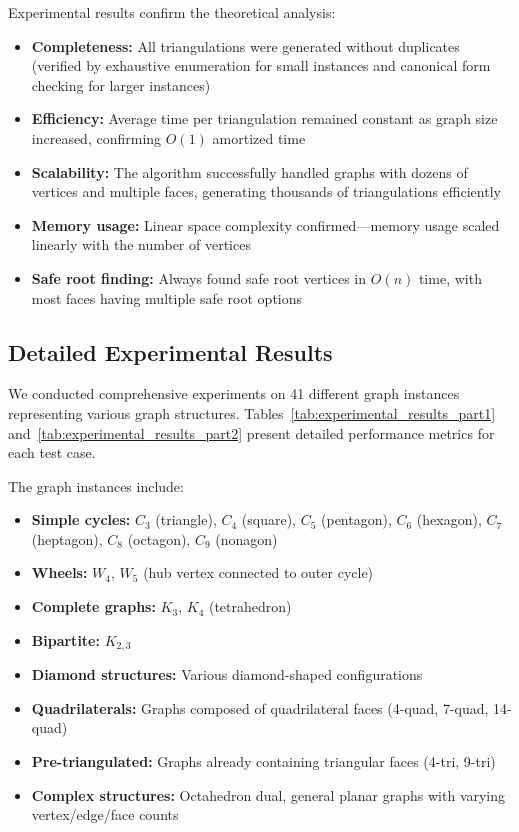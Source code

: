 \documentclass[12pt,a4paper]{article}
\theoremstyle{definition}
\theoremstyle{remark}
\begin{document}
Experimental results confirm the theoretical analysis:
\begin{itemize}
    \item \textbf{Completeness:} All triangulations were generated without duplicates (verified by exhaustive enumeration for small instances and canonical form checking for larger instances)
    \item \textbf{Efficiency:} Average time per triangulation remained constant as graph size increased, confirming $O(1)$ amortized time
    \item \textbf{Scalability:} The algorithm successfully handled graphs with dozens of vertices and multiple faces, generating thousands of triangulations efficiently
    \item \textbf{Memory usage:} Linear space complexity confirmed—memory usage scaled linearly with the number of vertices
    \item \textbf{Safe root finding:} Always found safe root vertices in $O(n)$ time, with most faces having multiple safe root options
\end{itemize}

\subsection{Detailed Experimental Results}

We conducted comprehensive experiments on 41 different graph instances representing various graph structures. Tables~\ref{tab:experimental_results_part1} and~\ref{tab:experimental_results_part2} present detailed performance metrics for each test case.

The graph instances include:
\begin{itemize}
    \item \textbf{Simple cycles:} $C_3$ (triangle), $C_4$ (square), $C_5$ (pentagon), $C_6$ (hexagon), $C_7$ (heptagon), $C_8$ (octagon), $C_9$ (nonagon)
    \item \textbf{Wheels:} $W_4$, $W_5$ (hub vertex connected to outer cycle)
    \item \textbf{Complete graphs:} $K_3$, $K_4$ (tetrahedron)
    \item \textbf{Bipartite:} $K_{2,3}$
    \item \textbf{Diamond structures:} Various diamond-shaped configurations
    \item \textbf{Quadrilaterals:} Graphs composed of quadrilateral faces (4-quad, 7-quad, 14-quad)
    \item \textbf{Pre-triangulated:} Graphs already containing triangular faces (4-tri, 9-tri)
    \item \textbf{Complex structures:} Octahedron dual, general planar graphs with varying vertex/edge/face counts
\end{itemize}
\end{document}
